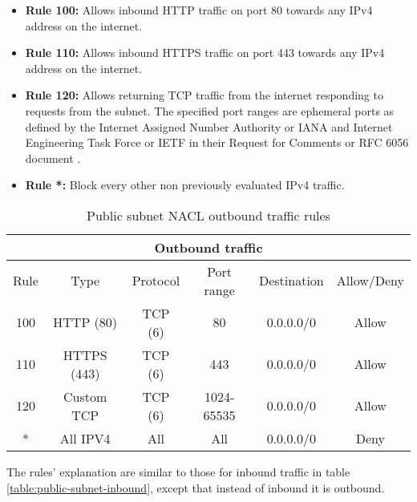 \begin{itemize}
    \item \textbf{Rule 100:} Allows inbound HTTP traffic on port 80 towards any IPv4 address on the internet.
    \item \textbf{Rule 110:} Allows inbound HTTPS traffic on port 443 towards any IPv4 address on the internet.
    \item \textbf{Rule 120:} Allows returning TCP traffic from the internet responding to requests from the subnet. The specified port ranges are ephemeral ports as defined by the Internet Assigned Number Authority or IANA and Internet Engineering Task Force or IETF in their Request for Comments or RFC 6056 document \cite{rfc6056}.
    \item \textbf{Rule *:} Block every other non previously evaluated IPv4 traffic.
\end{itemize}

\begin{table}[H]
    \centering
    \begin{tabular}{|c|c|c|c|c|c|}
        \hline
        \multicolumn{6}{|c|}{Outbound traffic}                                \\
        \hline
        Rule & Type        & Protocol & Port range & Destination & Allow/Deny \\
        \hline
        100  & HTTP (80)   & TCP (6)  & 80         & 0.0.0.0/0   & Allow      \\
        \hline
        110  & HTTPS (443) & TCP (6)  & 443        & 0.0.0.0/0   & Allow      \\
        \hline
        120  & Custom TCP  & TCP (6)  & 1024-65535 & 0.0.0.0/0   & Allow      \\
        \hline
        *    & All IPV4    & All      & All        & 0.0.0.0/0   & Deny       \\
        \hline
    \end{tabular}
    \caption{Public subnet NACL outbound traffic rules}
    \label{table:public-subnet-outbound}
\end{table}

The rules' explanation are similar to those for inbound traffic in table \ref{table:public-subnet-inbound}, except that instead of inbound it is outbound.




